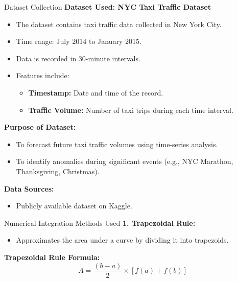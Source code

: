 \documentclass[10pt]{beamer}
\begin{document}
\begin{frame}{Dataset Collection}
    \textbf{Dataset Used: NYC Taxi Traffic Dataset}
    \begin{itemize}
        \item The dataset contains taxi traffic data collected in New York City.
        \item Time range: July 2014 to January 2015.
        \item Data is recorded in 30-minute intervals.
        \item Features include:
        \begin{itemize}
            \item \textbf{Timestamp:} Date and time of the record.
            \item \textbf{Traffic Volume:} Number of taxi trips during each time interval.
        \end{itemize}
    \end{itemize}

    \singlespacing

    \textbf{Purpose of Dataset:}
    \begin{itemize}
        \item To forecast future taxi traffic volumes using time-series analysis.
        \item To identify anomalies during significant events (e.g., NYC Marathon, Thanksgiving, Christmas).
    \end{itemize}

    \singlespacing

    \textbf{Data Sources:}
    \begin{itemize}
        \item Publicly available dataset on Kaggle.
    \end{itemize}
\end{frame}

\begin{frame}{Numerical Integration Methods Used}
    \textbf{1. Trapezoidal Rule:} 
    \begin{itemize}
        \item Approximates the area under a curve by dividing it into trapezoids.
    \end{itemize}
    \singlespacing
    \textbf{Trapezoidal Rule Formula:}
    \[
       A = \frac{(b-a)}{2} \times [f(a) + f(b)]
    \]
\end{frame}
\end{document}
